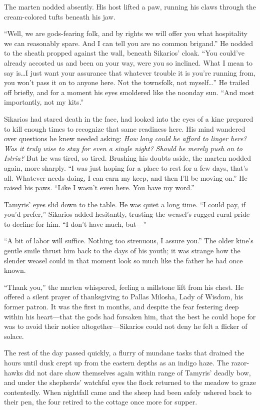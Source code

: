 The marten nodded absently. His host lifted a paw, running his claws through the cream-colored tufts beneath his jaw.

``Well, we are gods-fearing folk, and by rights we will offer you what hospitality we can reasonably spare. And I can tell you are no common brigand.'' He nodded to the sheath propped against the wall, beneath Sikarios' cloak. ``You could've already accosted us and been on your way, were you so inclined. What I mean to say is\ldots{}I just want your assurance that whatever trouble it is you're running from, you won't pass it on to anyone here. Not the townsfolk, not myself\ldots'' He trailed off briefly, and for a moment his eyes smoldered like the noonday sun. ``And most importantly, not my kits.''

Sikarios had stared death in the face, had looked into the eyes of a kine prepared to kill enough times to recognize that same readiness here. His mind wandered over questions he knew needed asking: \emph{How long could he afford to linger here? Was it truly wise to stay for even a single night?} \emph{Should he merely push on to Istria?} But he was tired, so tired. Brushing his doubts aside, the marten nodded again, more sharply. ``I was just hoping for a place to rest for a few days, that's all. Whatever needs doing, I can earn my keep, and then I'll be moving on.'' He raised his paws. ``Like I wasn't even here. You have my word.''

Tamyris' eyes slid down to the table. He was quiet a long time. ``I could pay, if you'd prefer,'' Sikarios added hesitantly, trusting the weasel's rugged rural pride to decline for him. ``I don't have much, but---''

``A bit of labor will suffice. Nothing too strenuous, I assure you.'' The older kine's gentle smile thrust him back to the days of his youth; it was strange how the slender weasel could in that moment look so much like the father he had once known.

``Thank you,'' the marten whispered, feeling a millstone lift from his chest. He offered a silent prayer of thanksgiving to Pallas Milosha, Lady of Wisdom, his former patron. It was the first in months, and despite the fear festering deep within his heart---that the gods had forsaken him, that the best he could hope for was to avoid their notice altogether---Sikarios could not deny he felt a flicker of solace.

\secdiv

\noindent The rest of the day passed quickly, a flurry of mundane tasks that drained the hours until dusk crept up from the eastern depths as an indigo haze. The razor-hawks did not dare show themselves again within range of Tamyris' deadly bow, and under the shepherds' watchful eyes the flock returned to the meadow to graze contentedly. When nightfall came and the sheep had been safely ushered back to their pen, the four retired to the cottage once more for supper.

